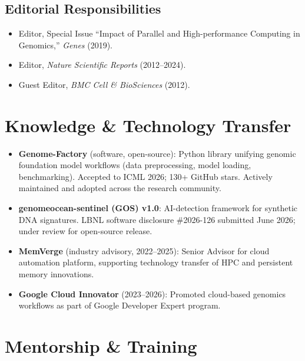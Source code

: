 \documentclass[11pt,letterpaper]{article}
\newenvironment{cvlist}
  {\begin{itemize}[leftmargin=1.4em, label=\textcolor{accent2}{\small$\bullet$},
    itemsep=2.5pt, topsep=2pt, parsep=0pt]}
  {\end{itemize}}
\begin{document}
\subsection{Editorial Responsibilities}
\begin{cvlist}
  \item Editor, Special Issue ``Impact of Parallel and High-performance Computing in Genomics,'' \textit{Genes} (2019).
  \item Editor, \textit{Nature Scientific Reports} (2012--2024).
  \item Guest Editor, \textit{BMC Cell \& BioSciences} (2012).
\end{cvlist}

\section{Knowledge \& Technology Transfer}
\begin{cvlist}
  \item \textbf{Genome-Factory} (software, open-source): Python library unifying genomic foundation model workflows (data preprocessing, model loading, benchmarking). Accepted to ICML 2026; 130+ GitHub stars. Actively maintained and adopted across the research community.
  \item \textbf{genomeocean-sentinel (GOS) v1.0}: AI-detection framework for synthetic DNA signatures. LBNL software disclosure \#2026-126 submitted June 2026; under review for open-source release.
  \item \textbf{MemVerge} (industry advisory, 2022--2025): Senior Advisor for cloud automation platform, supporting technology transfer of HPC and persistent memory innovations.
  \item \textbf{Google Cloud Innovator} (2023--2026): Promoted cloud-based genomics workflows as part of Google Developer Expert program.
\end{cvlist}

\section{Mentorship \& Training}
\end{document}
